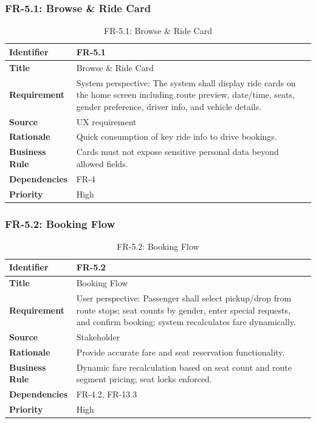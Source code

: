 \subsubsection{FR-5.1: Browse \& Ride Card}

\begin{longtable}{|p{3cm}|p{12cm}|}
\caption{FR-5.1: Browse \& Ride Card}
\label{tab:fr-5-1} \\
\hline
\rowcolor{lightgray!30}
\textbf{Identifier} & FR-5.1 \\
\hline
\textbf{Title} & Browse \& Ride Card \\
\hline
\textbf{Requirement} & System perspective: The system shall display ride cards on the home screen including route preview, date/time, seats, gender preference, driver info, and vehicle details. \\
\hline
\textbf{Source} & UX requirement \\
\hline
\textbf{Rationale} & Quick consumption of key ride info to drive bookings. \\
\hline
\textbf{Business Rule} & Cards must not expose sensitive personal data beyond allowed fields. \\
\hline
\textbf{Dependencies} & FR-4 \\
\hline
\textbf{Priority} & High \\
\hline
\end{longtable}

\subsubsection{FR-5.2: Booking Flow}

\begin{longtable}{|p{3cm}|p{12cm}|}
\caption{FR-5.2: Booking Flow}
\label{tab:fr-5-2} \\
\hline
\rowcolor{lightgray!30}
\textbf{Identifier} & FR-5.2 \\
\hline
\textbf{Title} & Booking Flow \\
\hline
\textbf{Requirement} & User perspective: Passenger shall select pickup/drop from route stops; seat counts by gender, enter special requests, and confirm booking; system recalculates fare dynamically. \\
\hline
\textbf{Source} & Stakeholder \\
\hline
\textbf{Rationale} & Provide accurate fare and seat reservation functionality. \\
\hline
\textbf{Business Rule} & Dynamic fare recalculation based on seat count and route segment pricing; seat locks enforced. \\
\hline
\textbf{Dependencies} & FR-4.2, FR-13.3 \\
\hline
\textbf{Priority} & High \\
\hline
\end{longtable}

